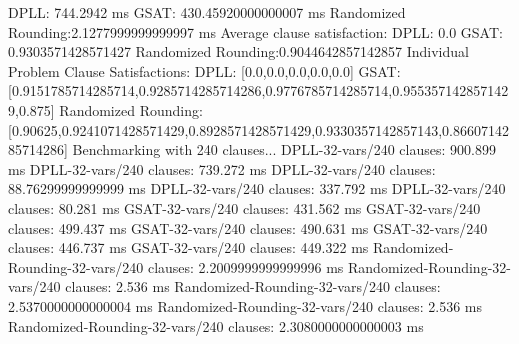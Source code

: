 \documentclass{article}
\begin{document}
  DPLL:               744.2942 ms\newline
  GSAT:               430.45920000000007 ms\newline
  Randomized Rounding:2.1277999999999997 ms\newline
Average clause satisfaction:\newline
  DPLL:               0.0\newline
  GSAT:               0.9303571428571427\newline
  Randomized Rounding:0.9044642857142857\newline
\newline
Individual Problem Clause Satisfactions:\newline
  DPLL:               [0.0,0.0,0.0,0.0,0.0]\newline
  GSAT:               [0.9151785714285714,0.9285714285714286,0.9776785714285714,0.9553571428571429,0.875]\newline
  Randomized Rounding:[0.90625,0.9241071428571429,0.8928571428571429,0.9330357142857143,0.8660714285714286]\newline
\newline
\newline
Benchmarking with 240 clauses...\newline
DPLL-32-vars/240 clauses: 900.899 ms\newline
DPLL-32-vars/240 clauses: 739.272 ms\newline
DPLL-32-vars/240 clauses: 88.76299999999999 ms\newline
DPLL-32-vars/240 clauses: 337.792 ms\newline
DPLL-32-vars/240 clauses: 80.281 ms\newline
GSAT-32-vars/240 clauses: 431.562 ms\newline
GSAT-32-vars/240 clauses: 499.437 ms\newline
GSAT-32-vars/240 clauses: 490.631 ms\newline
GSAT-32-vars/240 clauses: 446.737 ms\newline
GSAT-32-vars/240 clauses: 449.322 ms\newline
Randomized-Rounding-32-vars/240 clauses: 2.2009999999999996 ms\newline
Randomized-Rounding-32-vars/240 clauses: 2.536 ms\newline
Randomized-Rounding-32-vars/240 clauses: 2.5370000000000004 ms\newline
Randomized-Rounding-32-vars/240 clauses: 2.536 ms\newline
Randomized-Rounding-32-vars/240 clauses: 2.3080000000000003 ms\newline
\end{document}
